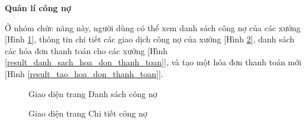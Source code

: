 \textbf{Quản lí công nợ}

Ở nhóm chức năng này, người dùng có thể xem danh sách công nợ của các xưởng [Hình \ref{result_danh_sach_cong_no}], thông tin chi tiết các giao dịch công nợ của xưởng [Hình \ref{result_chi_tiet_cong_no}], danh sách các hóa đơn thanh toán cho các xưởng [Hình \ref{result_danh_sach_hoa_don_thanh_toan}], và tạo một hóa đơn thanh toán mới [Hình \ref{result_tao_hoa_don_thanh_toan}].

\begin{figure}[H]
    \begin{center}
        \caption{Giao diện trang Danh sách công nợ}
        \label{result_danh_sach_cong_no}
    \end{center}
\end{figure}

\begin{figure}[H]
    \begin{center}
        \caption{Giao diện trang Chi tiết công nợ}
        \label{result_chi_tiet_cong_no}
    \end{center}
\end{figure}

